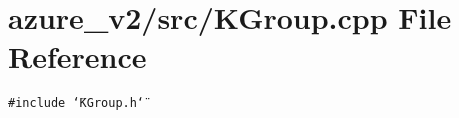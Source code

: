 \section{azure\_\-v2/src/KGroup.cpp File Reference}
\label{KGroup_8cpp}
{\tt \#include \char`\"{}KGroup.h\char`\"{}}\par
